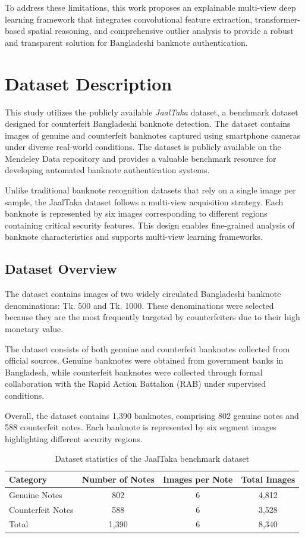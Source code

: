 \documentclass[preprint,12pt,authoryear]{elsarticle}
\begin{document}
To address these limitations, this work proposes an explainable multi-view deep learning framework that integrates convolutional feature extraction, transformer-based spatial reasoning, and comprehensive outlier analysis to provide a robust and transparent solution for Bangladeshi banknote authentication.

\section{Dataset Description}

This study utilizes the publicly available \textit{JaalTaka} dataset, a benchmark dataset designed for counterfeit Bangladeshi banknote detection. The dataset contains images of genuine and counterfeit banknotes captured using smartphone cameras under diverse real-world conditions. The dataset is publicly available on the Mendeley Data repository and provides a valuable benchmark resource for developing automated banknote authentication systems.

Unlike traditional banknote recognition datasets that rely on a single image per sample, the JaalTaka dataset follows a multi-view acquisition strategy. Each banknote is represented by six images corresponding to different regions containing critical security features. This design enables fine-grained analysis of banknote characteristics and supports multi-view learning frameworks.

\subsection{Dataset Overview}

The dataset contains images of two widely circulated Bangladeshi banknote denominations: Tk. 500 and Tk. 1000. These denominations were selected because they are the most frequently targeted by counterfeiters due to their high monetary value.

The dataset consists of both genuine and counterfeit banknotes collected from official sources. Genuine banknotes were obtained from government banks in Bangladesh, while counterfeit banknotes were collected through formal collaboration with the Rapid Action Battalion (RAB) under supervised conditions.

Overall, the dataset contains 1,390 banknotes, comprising 802 genuine notes and 588 counterfeit notes. Each banknote is represented by six segment images highlighting different security regions.

\begin{table}[h]
\centering
\caption{Dataset statistics of the JaalTaka benchmark dataset}
\begin{tabular}{lccc}
\hline
Category & Number of Notes & Images per Note & Total Images \\
\hline
Genuine Notes & 802 & 6 & 4,812 \\
Counterfeit Notes & 588 & 6 & 3,528 \\
\hline
Total & 1,390 & 6 & 8,340 \\
\hline
\end{tabular}
\end{table}
\end{document}
